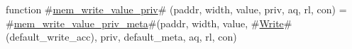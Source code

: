 function #\hyperref[sailRISCVzmemzywritezyvaluezypriv]{mem\_write\_value\_priv}# (paddr, width, value, priv, aq, rl, con) =
  #\hyperref[sailRISCVzmemzywritezyvaluezyprivzymeta]{mem\_write\_value\_priv\_meta}#(paddr, width, value, #\hyperref[sailRISCVzWrite]{Write}#(default_write_acc), priv, default_meta, aq, rl, con)
